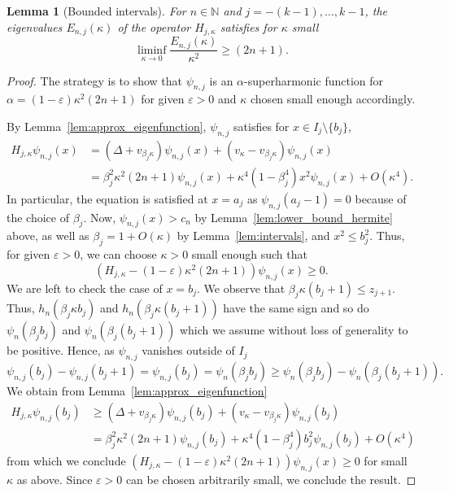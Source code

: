 \documentclass[12pt, reqno]{amsart}
\newtheorem{lemma}[theorem]{Lemma}
\theoremstyle{definition}
\numberwithin{equation}{section}
\newcommand{\N}{{\mathbb N}}
\begin{document}
\begin{lemma}[Bounded intervals]\label{lem:lower_bound_interval}
    For   $n\in \N$ and $j=-(k-1),\ldots,k-1$,  the eigenvalues $E_{n,j}(\kappa)$ of the operator $H_{j,\kappa}$ satisfies for  $\kappa$ small 
    $$\liminf_{\kappa\to 0}\frac{E_{n,j}(\kappa)}{\kappa^2} \geq   (2n+1).$$
\end{lemma}
\begin{proof}
    The strategy is to show that $\psi_{n,j}$ is an $\alpha$-superharmonic function for $\alpha = (1-\varepsilon)\kappa^2(2n+1) $ for given $\varepsilon>0$ and $\kappa$ chosen small enough accordingly.
    
   By Lemma~\ref{lem:approx_eigenfunction}, $\psi_{n,j}$ satisfies for $x\in I_j\setminus \{b_j\}  $,
   \begin{align*}
      H_{j,\kappa}\psi_{n,j}(x)&=    (\Delta + v_{\beta_j\kappa})\psi_{n,j}(x) + (v_{\kappa}- v_{\beta_j\kappa})\psi_{n,j}(x) \\
         &
         = \beta_j^2 \kappa^2 (2n+1)  \psi_{n,j}(x)+ {\kappa}^4(1-\beta_j^4)x^2\psi_{n,j}(x)+ O(\kappa^4).
   \end{align*} 
   In particular,   the equation is satisfied at $x=a_j$ as $\psi_{n,j}(a_j-1)=0$ because of the choice of $\beta_j$. Now,  $\psi_{n,j}(x)>c_n$ by Lemma~\ref{lem:lower_bound_hermite} above, as well as $\beta_j=1+O(\kappa)$ by Lemma~\ref{lem:intervals}, and $x^2\le b_j^2$. Thus, for given $\varepsilon>0$, we can choose $ \kappa>0$ small enough such that
   $$ ( H_{j,\kappa} -(1-\varepsilon)\kappa^2(2n+1) )\psi_{n,j}(x) \ge 0.$$
   We are left to check the case of $x=b_j$. We observe that $\beta_j\kappa(b_j+1) \le z_{j+1}$. Thus,  $h_n(\beta_j\kappa b_j)$ and  $h_n(\beta_j\kappa(b_j+1))$ have the same sign and so do $\psi_n(\beta_jb_j)$ and  $\psi_n(\beta_j(b_j+1))$ which we assume without loss of generality to be positive.
   Hence, as $\psi_{n,j}$ vanishes outside of $I_j$
   $$  \psi_{n,j}( b_j)-\psi_{n,j}( b_j+1)=\psi_{n,j}(b_j)=\psi_n(\beta_jb_j) \ge 
   \psi_n(\beta_jb_j)-\psi_n(\beta_j(b_j+1)). $$
   We obtain from Lemma~\ref{lem:approx_eigenfunction}
\begin{align*}
      H_{j,\kappa}\psi_{n,j}(b_j)&\ge    (\Delta + v_{\beta_j\kappa})\psi_{n,j}(b_j) + (v_{\kappa}- v_{\beta_j\kappa})\psi_{n,j}(b_j) \\
         &
         = \beta_j^2 \kappa^2 (2n+1)  \psi_{n,j}(b_j)+ {\kappa}^4(1-\beta_j^4)b_j^2\psi_{n,j}(b_j)+ O(\kappa^4)
   \end{align*} 
   from which we conclude $ ( H_{j,\kappa} -(1-\varepsilon)\kappa^2(2n+1) )\psi_{n,j}(x) \ge 0$ for small $\kappa$ as above. Since $\varepsilon >0$ can be chosen arbitrarily small, we conclude the result.
\end{proof}
\end{document}
